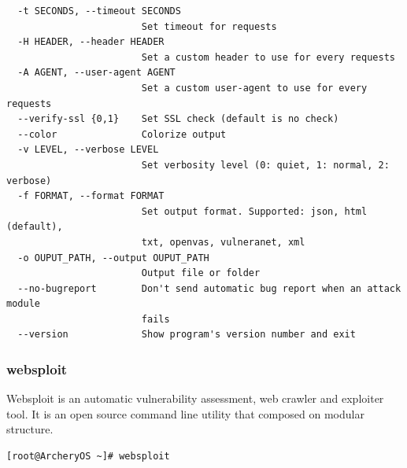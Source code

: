 \documentclass{article}
\begin{document}
\begin{lstlisting}
  -t SECONDS, --timeout SECONDS
                        Set timeout for requests
  -H HEADER, --header HEADER
                        Set a custom header to use for every requests
  -A AGENT, --user-agent AGENT
                        Set a custom user-agent to use for every requests
  --verify-ssl {0,1}    Set SSL check (default is no check)
  --color               Colorize output
  -v LEVEL, --verbose LEVEL
                        Set verbosity level (0: quiet, 1: normal, 2: verbose)
  -f FORMAT, --format FORMAT
                        Set output format. Supported: json, html (default),
                        txt, openvas, vulneranet, xml
  -o OUPUT_PATH, --output OUPUT_PATH
                        Output file or folder
  --no-bugreport        Don't send automatic bug report when an attack module
                        fails
  --version             Show program's version number and exit
\end{lstlisting}

\subsubsection{websploit}
Websploit is an automatic vulnerability assessment, web crawler and exploiter tool. It is an open source command line utility that composed on modular structure.
\begin{lstlisting}
[root@ArcheryOS ~]# websploit
\end{lstlisting}
\end{document}
